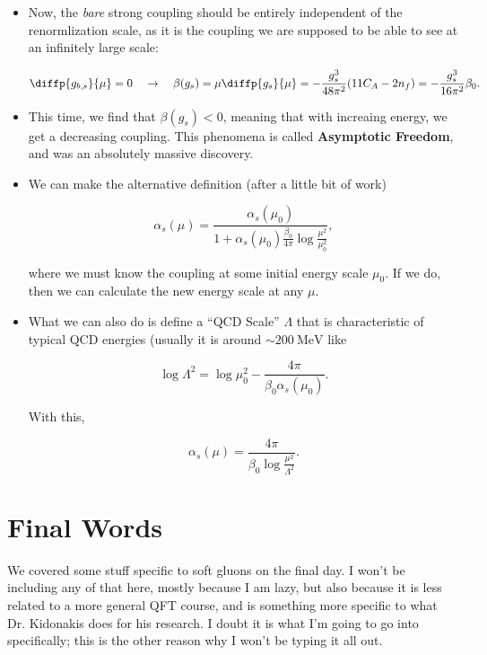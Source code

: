 \begin{itemize}
  
\item Now, the \textit{bare} strong coupling should be entirely independent of the renormlization scale, as it is the coupling we are supposed to be able to see at an infinitely large scale:

  \begin{equation}
    \diffp{g_{b,s}}{\mu} = 0 \quad\rightarrow\quad \beta(g_s) = \mu\diffp{g_s}{\mu} = - \frac{g_s^3}{48\pi^2}(11C_A - 2n_f) = - \frac{g_s^3}{16\pi^2} \beta_0.
  \end{equation}

\item This time, we find that $\beta(g_s) < 0$, meaning that with increaing energy, we get a decreasing coupling. This phenomena is called \textbf{Asymptotic Freedom}, and was an absolutely massive discovery.

\item We can make the alternative definition (after a little bit of work)

  \begin{equation}
    \alpha_s(\mu) = \frac{\alpha_s(\mu_0)}{1 + \alpha_s(\mu_0) \frac{\beta_0}{4\pi}\log \frac{\mu^2}{\mu_0^2}},
  \end{equation}

  where we must know the coupling at some initial energy scale $\mu_0$. If we do, then we can calculate the new energy scale at any $\mu$.

\item What we can also do is define a ``QCD Scale'' $\Lambda$ that is characteristic of typical QCD energies (usually it is around $\sim \qty{200}{\mega\electronvolt}$ like

  \begin{equation}
    \log\Lambda^2 = \log\mu_0^2 - \frac{4\pi}{\beta_0 \alpha_s(\mu_0)}.
  \end{equation}

  With this,

  \begin{equation}
    \alpha_s(\mu) = \frac{4\pi}{\beta_0 \log \frac{\mu^2}{\Lambda^2}}.
  \end{equation}

  
\end{itemize}



\section{Final Words}

We covered some stuff specific to soft gluons on the final day. I won't be including any of that here, mostly because I am lazy, but also because it is less related to a more general QFT course, and is something more specific to what Dr. Kidonakis does for his research. I doubt it is what I'm going to go into specifically; this is the other reason why I won't be typing it all out.






